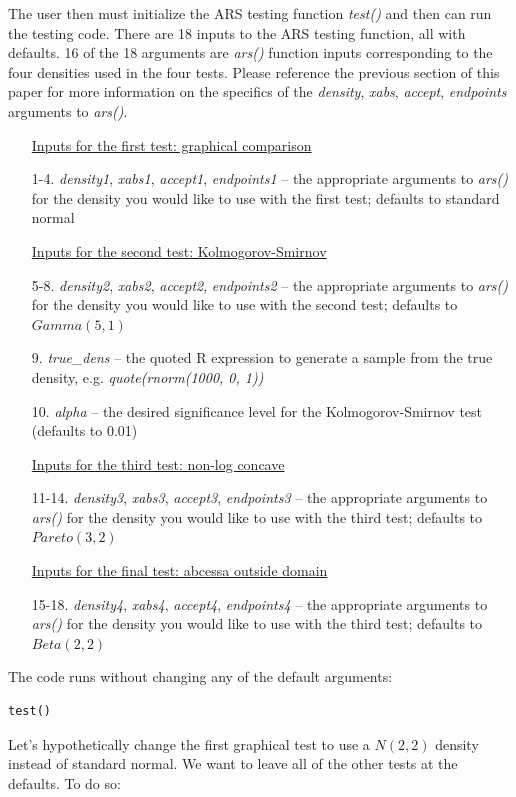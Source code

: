 \documentclass{article}
\begin{document}
The user then must initialize the ARS testing function \textit{test()} and then can run the testing code. There are 18 inputs to the ARS testing function, all with defaults.  16 of the 18 arguments are \textit{ars()} function inputs corresponding to the four densities used in the four tests.  Please reference the previous section of this paper for more information on the specifics of the \textit{density}, \textit{xabs}, \textit{accept}, \textit{endpoints} arguments to \textit{ars()}.
\begin{enumerate}
  \item [] \underline{Inputs for the first test: graphical comparison}
  \item [1-4.] \textit{density1}, \textit{xabs1}, \textit{accept1}, \textit{endpoints1} -- the appropriate arguments to \textit{ars()} for the density you would like to use with the first test; defaults to standard normal
  \item [] \underline{Inputs for the second test: Kolmogorov-Smirnov}
  \item [5-8.] \textit{density2}, \textit{xabs2}, \textit{accept2}, \textit{endpoints2} -- the appropriate arguments to \textit{ars()} for the density you would like to use with the second test; defaults to $Gamma\left(5,1\right)$
  \item [9.] \textit{true\_dens} -- the quoted R expression to generate a sample from the true density, e.g. \textit{quote(rnorm(1000, 0, 1))}
  \item [10.] \textit{alpha} -- the desired significance level for the Kolmogorov-Smirnov test (defaults to 0.01)
  \item [] \underline{Inputs for the third test: non-log concave}
  \item [11-14.] \textit{density3}, \textit{xabs3}, \textit{accept3}, \textit{endpoints3} -- the appropriate arguments to \textit{ars()} for the density you would like to use with the third test; defaults to $Pareto\left(3,2\right)$
  \item [] \underline{Inputs for the final test: abcessa outside domain}
  \item [15-18.] \textit{density4}, \textit{xabs4}, \textit{accept4}, \textit{endpoints4} -- the appropriate arguments to \textit{ars()} for the density you would like to use with the third test; defaults to $Beta\left(2,2\right)$
\end{enumerate}
The code runs without changing any of the default arguments:

\begin{lstlisting}
test()
\end{lstlisting}
Let's hypothetically change the first graphical test to use a $N\left(2,2\right)$ density instead of standard normal.  We want to leave all of the other tests at the defaults.  To do so:
\end{document}
